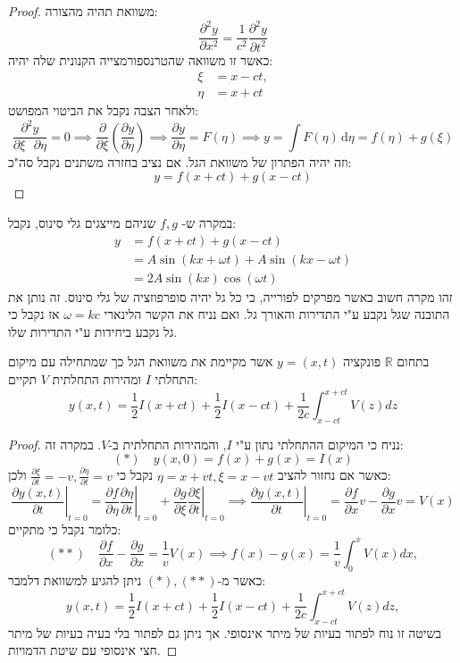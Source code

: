 \documentclass{tstextbook}
\begin{document}
\begin{proof}
משוואת תהיה מהצורה:
$$ \frac{\partial^2y}{\partial x^2}=\frac1{c^2}\frac{\partial^2y}{\partial t^2}$$
כאשר זו משוואה שהטרנספורמצייה הקנונית שלה יהיה:
$$ \begin{aligned}\xi&=x-c t,\\\eta&=x+c t\end{aligned}$$
ולאחר הצבה נקבל את הביטוי המפושט:
$$ \frac{\partial^2y}{\partial\xi\text{ }\partial\eta}=0\implies \frac{\partial }{\partial \xi}\left( \frac{\partial y}{\partial \eta} \right)\implies \frac{\partial y}{\partial\eta}=F\left( \eta \right)\implies y=\int  F\left( \eta \right)\, \mathrm{d}\eta=f\left( \eta \right)+g\left( \xi \right) $$
וזה יהיה הפתרון של משוואת הגל. אם נציב בחזרה משתנים נקבל סה"כ:
$$ y=f(x+c t)+g(x-c t)$$

\end{proof}
\begin{remark}
במקרה ש- \(f,g\) שניהם מייצגים גלי סינוס, נקבל:
$$ \begin{aligned}y&=f\left( x+c t \right)+g\left( x-c t \right)\\&=A\sin\left( kx+\omega t \right)+A\sin\left( kx-\omega t \right)\\
&=2A\sin(kx)\cos\left( \omega t \right)\end{aligned}$$
זהו מקרה חשוב כאשר מפרקים לפורייה, כי כל גל יהיה סופרפוזציה של גלי סינוס. זה נותן את התובנה שגל נקבע ע"י התדירות והאורך גל. ואם נניח את הקשר הלינארי \(\omega=kc\) אז נקבל כי גל נקבע ביחידות ע"י התדירות שלו.

\end{remark}
\begin{proposition}
בתחום \(\mathbb{R}\) פונקציה \(y=(x,t)\) אשר מקיימת את משוואת הגל כך שמתחילה עם מיקום התחלתי \(I\) ומהירות התחלתית \(V\) תקיים:
$$ y(x,t)=\frac12I(x+ c  t)+\frac12I(x- c  t)+\frac1{2 c }\int_{x- c  t}^{x+ c  t}V(z)dz$$

\end{proposition}
\begin{proof}
נניח כי המיקום ההתחלתי נתון ע"י \(I\), והמהירות התחלתית ב-\(V\). במקרה זה:
$$(*)\quad  y(x,0)=f(x)+g(x)=I(x)$$
כאשר אם נחזור להציב \(\eta=x+vt,\xi=x-vt\) נקבל כי \(\frac{\partial \xi}{\partial t}=-v,\frac{\partial \eta}{\partial t}=v\) ולכן:
$$ \left.\frac{\partial y(x,t)}{\partial t}\right|_{t=0}=\left.\frac{\partial f}{\partial\eta}\frac{\partial\eta}{\partial t}\right|_{t=0}+\left.\frac{\partial g}{\partial\xi}\frac{\partial\xi}{\partial t}\right|_{t=0}\implies  \left.\frac{\partial y(x,t)}{\partial t}\right|_{t=0}=\frac{\partial f}{\partial x}v-\frac{\partial g}{\partial x}v=V(x)$$
כלומר נקבל כי מתקיים:
$$(* *)\quad  \frac{\partial f}{\partial x}-\frac{\partial g}{\partial x}=\frac{1}{v} V(x)\implies  f(x)-g(x)=\frac{1}{v}\int_0^xV(x)dx,$$
כאשר מ-\((*),(* *)\) ניתן להגיע למשוואת דלמבר:
$$ y(x,t)=\frac12I(x+ c  t)+\frac12I(x- c  t)+\frac1{2 c }\int_{x- c  t}^{x+ c  t}V(z)dz,$$
בשיטה זו נוח לפתור בעיות של מיתר אינסופי. אך ניתן גם לפתור בלי בעיה בעיות של מיתר חצי אינסופי עם שיטת הדמויות.

\end{proof}
\end{document}
